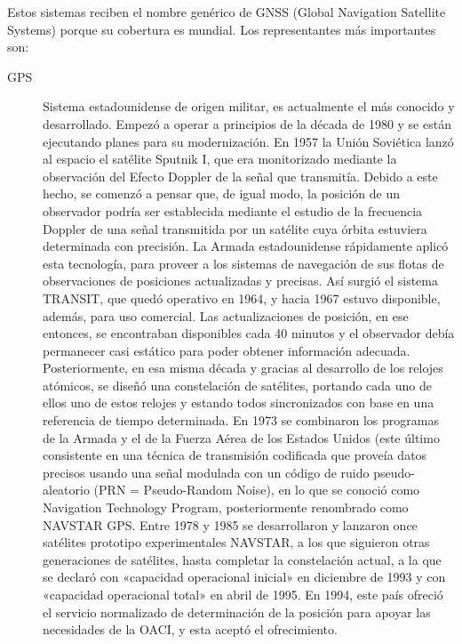 \documentclass[a4paper,12pt,twoside]{article}
\begin{document}
Estos sistemas reciben el nombre gen\'erico de GNSS (Global Navigation Satellite Systems) porque su cobertura es mundial. Los representantes m\'as importantes son:

\begin{description}
\item [GPS] Sistema estadounidense de origen militar, es actualmente el m\'as conocido y desarrollado. Empez\'o a operar a principios de la d\'ecada de 1980 y se est\'an ejecutando planes para su modernizaci\'on.%
 En 1957 la Uni\'on Sovi\'etica lanz\'o al espacio el sat\'elite Sputnik I, que era monitorizado mediante la observaci\'on del Efecto Doppler de la se\~nal que transmit\'ia. Debido a este hecho, se comenz\'o a pensar que, de igual modo, la posici\'on de un observador podr\'ia ser establecida mediante el estudio de la frecuencia Doppler de una se\~nal transmitida por un sat\'elite cuya \'orbita estuviera determinada con precisi\'on.
La Armada estadounidense r\'apidamente aplic\'o esta tecnolog\'ia, para proveer a los sistemas de navegaci\'on de sus flotas de observaciones de posiciones actualizadas y precisas. As\'i surgi\'o el sistema TRANSIT, que qued\'o operativo en 1964, y hacia 1967 estuvo disponible, adem\'as, para uso comercial.
Las actualizaciones de posici\'on, en ese entonces, se encontraban disponibles cada 40 minutos y el observador deb\'ia permanecer casi est\'atico para poder obtener informaci\'on adecuada.
Posteriormente, en esa misma d\'ecada y gracias al desarrollo de los relojes at\'omicos, se dise\~n\'o una constelaci\'on de sat\'elites, portando cada uno de ellos uno de estos relojes y estando todos sincronizados con base en una referencia de tiempo determinada.
En 1973 se combinaron los programas de la Armada y el de la Fuerza A\'erea de los Estados Unidos (este \'ultimo consistente en una t\'ecnica de transmisi\'on codificada que prove\'ia datos precisos usando una se\~nal modulada con un c\'odigo de ruido pseudo-aleatorio (PRN = Pseudo-Random Noise), en lo que se conoci\'o como Navigation Technology Program, posteriormente renombrado como NAVSTAR GPS.
Entre 1978 y 1985 se desarrollaron y lanzaron once sat\'elites prototipo experimentales NAVSTAR, a los que siguieron otras generaciones de sat\'elites, hasta completar la constelaci\'on actual, a la que se declar\'o con «capacidad operacional inicial» en diciembre de 1993 y con «capacidad operacional total» en abril de 1995.
En 1994, este pa\'is ofreci\'o el servicio normalizado de determinaci\'on de la posici\'on para apoyar las necesidades de la OACI, y esta acept\'o el ofrecimiento.


\end{description}
\end{document}
